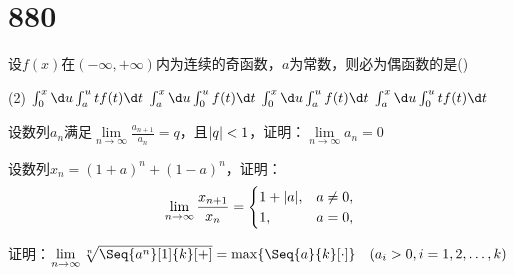 \section{880}
\begin{question}
设$f(x)$在$(-\infty,+\infty)$内为连续的奇函数，$a$为常数，则必为偶函数的是(\quad)
\begin{tasks}(2)
    \task $\int_{0}^{x} \d u \int_{a}^{u} tf(t) \d t$
    \task $\int_{a}^{x} \d u \int_{0}^{u} f(t) \d t$
    \task $\int_{0}^{x} \d u \int_{a}^{u} f(t) \d t$
    \task $\int_{a}^{x} \d u \int_{0}^{u} tf(t) \d t$
\end{tasks}
\end{question}
\begin{question}
    设数列$ {a_n} $满足$ \lim\limits_{n \to \infty} \frac{a_{n+1}}{a_n} = q $，且$ \lvert q\rvert < 1 $，证明：$ \lim\limits_{n \to \infty} a_n = 0 $
\end{question}
\begin{question}
    设数列$ x_n = (1 + a) ^ n + (1 - a) ^ n $，证明：
    \begin{equation}
        \nonumber
         \lim\limits_{n \to \infty} \frac{x_{n + 1}}{x_n} = 
         \begin{cases}
            1 + \lvert a\rvert,  &a \neq 0, \\
            1,            &a = 0,
         \end{cases}
    \end{equation}
\end{question}
\begin{question}
    证明：$ \lim\limits_{n \to \infty} \sqrt[n]{\Seq{a ^ n}[1]{k}[+]} = \max \{\Seq{a}{k}[\cdot]\} \quad (a_i > 0, i = 1, 2, \dots , k)$
\end{question}